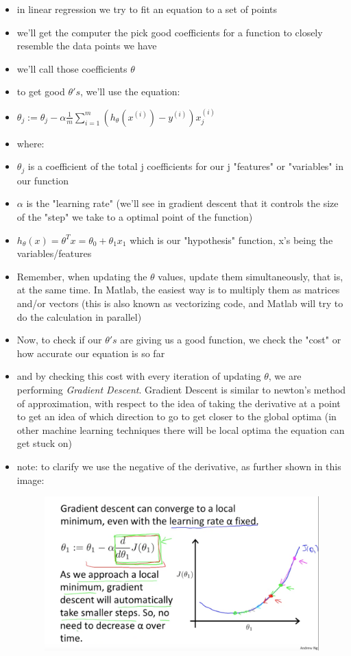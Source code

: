 \documentclass[]{article}
\begin{document}
\begin{itemize}
	\item in linear regression we try to fit an equation to a set of points
	\item we'll get the computer the pick good coefficients for a function to closely resemble the data points we have
	\item we'll call those coefficients $\theta$
	\item to get good $\theta's$, we'll use the equation:
	\item $\theta_j:=\theta_j-\alpha\frac{1}{m}\sum\limits_{i=1}^{m}(h_\theta(x^{(i)})-y^{(i)})x_j^(i)$
	\item where:
	\item $\theta_j$ is a coefficient of the total j coefficients for our j "features" or "variables" in our function
	\item $\alpha$ is the "learning rate" (we'll see in gradient descent that it controls the size of the "step" we take to a optimal point of the function)
	\item $h_\theta(x) = \theta^Tx=\theta_0 + \theta_1x_1$ which is our "hypothesis" function, x's being the variables/features
	\item Remember, when updating the $\theta$ values, update them simultaneously, that is, at the same time. In Matlab, the easiest way is to multiply them as matrices and/or vectors (this is also known as vectorizing code, and Matlab will try to do the calculation in parallel)
	\item Now, to check if our $\theta's$ are giving us a good function, we check the "cost" or how accurate our equation is so far
	\item and by checking this cost with every iteration of updating $\theta$, we are performing \emph{Gradient Descent}. Gradient Descent is similar to newton's method of approximation, with respect to the idea of taking the derivative at a point to get an idea of which direction to go to get closer to the global optima (in other machine learning techniques there will be local optima the equation can get stuck on)
	\item note: to clarify we use the negative of the derivative, as further shown in this image:
	\begin{figure}[ht!]
		\includegraphics[width= 1.5\textwidth,center]{intuition_on_gradient_descent.png}

\end{figure}
\end{itemize}
\end{document}
